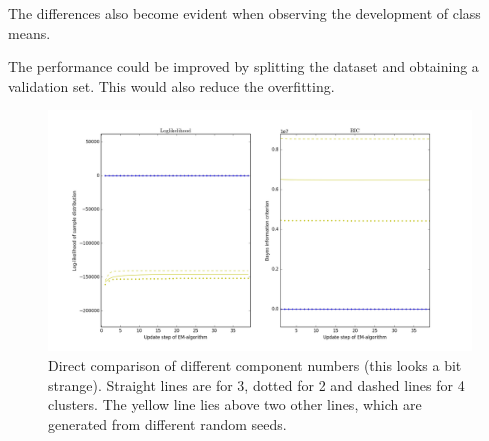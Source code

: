 The differences also become evident when observing the development of class means.

The performance could be improved by splitting the dataset and obtaining a validation set. This would also reduce the overfitting.

\begin{figure}[H]
	\centering \includegraphics{../Figures/Ex43_llh_all.png}
	\caption{Direct comparison of different component numbers (this looks a bit strange). Straight lines are for 3, dotted for 2 and dashed lines for 4 clusters. The yellow line lies above two other lines, which are generated from different random seeds.}
	\label{fig:43_means_all}
\end{figure}

